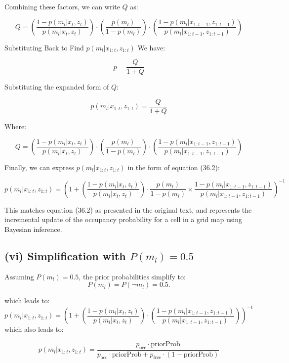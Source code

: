 \documentclass[template,12pt,a4paper,enabledeprecatedfontcommands]{template}
\begin{document}
\noindent Combining these factors, we can write \( Q \) as:

\[
Q = \left( \frac{1 - p(m_l | x_t, z_t)}{p(m_l | x_t, z_t)} \right) \cdot \left( \frac{p(m_l)}{1 - p(m_l)} \right) \cdot \left( \frac{1 - p(m_l | x_{1:t-1}, z_{1:t-1})}{p(m_l | x_{1:t-1}, z_{1:t-1})} \right)
\]

\noindent Substituting Back to Find \( p(m_l | x_{1:t}, z_{1:t}) \)
We have:

\[
p = \frac{Q}{1 + Q}
\]

\noindent Substituting the expanded form of \( Q \):

\[
p(m_l | x_{1:t}, z_{1:t}) = \frac{Q}{1 + Q}
\]

\noindent Where:

\[
Q = \left( \frac{1 - p(m_l | x_t, z_t)}{p(m_l | x_t, z_t)} \right) \cdot \left( \frac{p(m_l)}{1 - p(m_l)} \right) \cdot \left( \frac{1 - p(m_l | x_{1:t-1}, z_{1:t-1})}{p(m_l | x_{1:t-1}, z_{1:t-1})} \right)
\]

\noindent Finally, we can express \( p(m_l | x_{1:t}, z_{1:t}) \) in the form of equation (36.2):

\[
p(m_l | x_{1:t}, z_{1:t}) = \left( 1 + \left( \frac{1 - p(m_l | x_t, z_t)}{p(m_l | x_t, z_t)} \right) \cdot \frac{p(m_l)}{1 - p(m_l)} \times \frac{1 - p(m_l | x_{1:t-1}, z_{1:t-1})}{p(m_l | x_{1:t-1}, z_{1:t-1})} \right)^{-1}
\]

\noindent This matches equation (36.2) as presented in the original text, and represents the incremental update of the occupancy probability for a cell in a grid map using Bayesian inference.



\subsection*{(vi) Simplification with \( P(m_l) = 0.5 \)}
Assuming \( P(m_l) = 0.5 \), the prior probabilities simplify to:
\[
P(m_l) = P(\neg m_l) = 0.5.
\]

\noindent which leads to:
\[
p(m_l | x_{1:t}, z_{1:t}) = \left( 1 + \left( \frac{1 - p(m_l | x_t, z_t)}{p(m_l | x_t, z_t)} \right) \cdot \left( \frac{1 - p(m_l | x_{1:t-1}, z_{1:t-1})}{p(m_l | x_{1:t-1}, z_{1:t-1})} \right) \right) ^{-1}
\]
\noindent which also leads to:


\begin{equation}
p(m_l | x_{1:t}, z_{1:t}) = \frac{p_{\text{occ}} \cdot \text{priorProb}}{p_{\text{occ}} \cdot \text{priorProb} + p_{\text{free}} \cdot (1 - \text{priorProb})}
\label{eqn:probability}
\end{equation}
\end{document}
